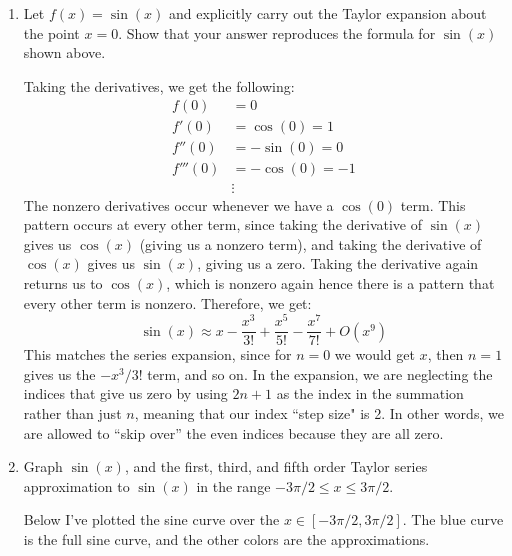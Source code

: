 \documentclass[10pt]{article}
\begin{document}
	\begin{enumerate}[label=\alph*)]
		\item Let $f(x) = \sin(x)$ and explicitly carry out the Taylor expansion about the point $x = 0$. Show
			that your answer reproduces the formula for $\sin(x)$ shown above.

			\begin{solution}
				Taking the derivatives, we get the following:
				\begin{align*}
					f(0) &=  0 \\
					f'(0) &=  \cos(0) = 1 \\
					f''(0) &= -\sin(0) = 0 \\
					f'''(0) &= -\cos(0) = -1 \\
							&\vdots
				\end{align*}
				The nonzero derivatives occur whenever we have a $\cos(0)$ term. This pattern occurs at every 
				other term, since taking the derivative of $\sin(x)$ gives us $\cos(x)$ (giving us a nonzero
				term), and taking the derivative of $\cos(x)$ gives us $\sin(x)$, giving us a zero. Taking the 
				derivative again returns us to $\cos(x)$, which is nonzero again hence there is a pattern that 
				every other term is nonzero. Therefore, we get:
				\[
				\sin(x) \approx x - \frac{x^3}{3!} + \frac{x^5}{5!} - \frac{x^7}{7!} + O(x^9)
				\] 
				This matches the series expansion, since for $n = 0$ we would get $x$, then $n = 1$ gives us 
				the $-x^3 / 3!$ term, and so on. In the expansion, we are neglecting the indices that give us 
				zero by using $2n + 1$ as the index in the summation rather than just $n$, meaning that 
				our index ``step size" is 2. In other words, we are allowed to ``skip over'' the even indices
				because they are all zero. 
			\end{solution}
		\item Graph $\sin(x)$, and the first, third, and fifth order Taylor series approximation to $\sin(x)$ 
			in the range $-3\pi/2 \le x \le 3\pi/2$. 

			\begin{solution}
				Below I've plotted the sine curve over the $x \in [-3\pi/2, 3 \pi /2]$. The blue curve is the full sine 
				curve, and the other colors are the approximations. 


\end{solution}
\end{enumerate}
\end{document}

